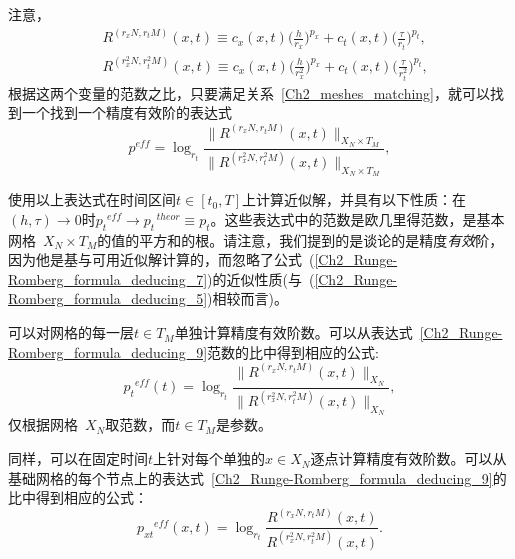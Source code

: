 \documentclass[twoside]{book}
\begin{document}
\begin{CJK*}{GBK}{song}
	注意，
	\begin{equation}
	\label{Ch2_Runge-Romberg_formula_deducing_9}
	\begin{aligned}
	&R^{({r_x} N, {r_t} M)}(x,t) \equiv c_x(x,t) \Big(\frac{h}{r_x}\Big)^{p_x} +  c_t(x,t) \Big(\frac{\tau}{r_t}\Big)^{p_t},\\
	&R^{(r_x^2 N, r_t^2 M)}(x,t) \equiv c_x(x,t) \Big(\frac{h}{r_x^2}\Big)^{p_x} +  c_t(x,t) \Big(\frac{\tau}{r_t^2}\Big)^{p_t},
	\end{aligned}
	\end{equation}
	根据这两个变量的范数之比，只要满足关系~\eqref{Ch2_meshes_matching}，就可以找到一个找到一个精度有效阶的表达式
	\begin{equation}
	\label{Ch2_Runge-Romberg_formula_deducing_10}
	{p}^{eff}  = \log_{r_t} \frac{\|R^{({r_x} N, {r_t} M)}(x,t)\|_{X_{N}\times T_{M}}}{\|R^{(r_x^2 N, r_t^2 M)}(x,t)\|_{X_{N}\times T_{M}}},
	\end{equation}
	
	使用以上表达式在时间区间$t \in [t_0,T]$上计算近似解，并具有以下性质：在$(h,\tau) \to 0$时${p_t}^{eff} \to {p_t}^{\, theor} \equiv {p_t}$。这些表达式中的范数是欧几里得范数，是基本网格~$X_{N}\times T_{M}$的值的平方和的根。请注意，我们提到的是谈论的是精度\emph{有效}阶，因为他是基与可用近似解计算的，而忽略了公式~(\ref{Ch2_Runge-Romberg_formula_deducing_7})的近似性质(与~(\ref{Ch2_Runge-Romberg_formula_deducing_5})相较而言)。
	
	可以对网格的每一层$t \in T_M$单独计算精度有效阶数。可以从表达式~\eqref{Ch2_Runge-Romberg_formula_deducing_9}范数的比中得到相应的公式:
	\begin{equation}
	\label{Ch2_Runge-Romberg_formula_deducing_11}
	{p_t}^{eff}(t)  = \log_{r_t} \frac{\|R^{(r_x N, r_t M)}(x,t)\|_{X_N}}{\|R^{(r_x^2 N, r_t^2 M)}(x,t)\|_{X_N}},
	\end{equation}
	仅根据网格~$X_N$取范数，而$t\in T_M$是参数。
	
	同样，可以在固定时间$t$上针对每个单独的$x \in X_N$逐点计算精度有效阶数。可以从基础网格的每个节点上的表达式~\eqref{Ch2_Runge-Romberg_formula_deducing_9}的比中得到相应的公式：
	\begin{equation}
	\label{Ch2_Runge-Romberg_formula_deducing_12}
	{p_{xt}}^{eff}(x,t)  = \log_{r_t} \frac{R^{(r_x N, r_t M)}(x,t)}{R^{(r_x^2 N, r_t^2 M)}(x,t)}.
	\end{equation}
	

\end{CJK*}
\end{document}
